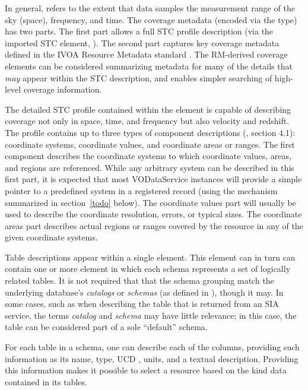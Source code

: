 \documentclass[11pt,a4paper]{ivoa}
\begin{document}
In general,  refers to
the extent that data samples the measurement range of the sky (space),
frequency, and time.  The coverage metadata (encoded via the
 type) has two parts.  The first part
allows a full STC profile description (via the imported STC element,
).  The second part
captures key coverage metadata defined in the IVOA Resource Metadata
standard \citep{RM}.  The RM-derived coverage elements can
be considered summarizing metadata for many of the details that
\emph{may} appear within the STC description, and enables simpler
searching of high-level coverage information.



The detailed STC profile contained within the
 element is capable of
describing coverage not only in space, time, and frequency but also
velocity and redshift.  The profile contains up to three types of
component descriptions (\citep{STC}, section 4.1):
coordinate systems, coordinate values, and coordinate areas or ranges.
The first component describes the coordinate systems to which coordinate
values, areas, and regions are referenced.  While any arbitrary
system can be described in this first part, it is expected that most
VODataService instances will provide a simple pointer to a predefined
system in a registered  record (using the
mechanism summarized in section~\ref{todo} below).  The coordinate values
part will usually be used to describe the coordinate resolution,
errors, or typical sizes.  The coordinate areas part describes actual
regions or ranges covered by the resource in any of the given
coordinate systems.  


Table descriptions appear within a single 
element.  This element can in turn can contain one or more
 element in which each schema
represents a set of logically related tables.  It is not required that 
that the schema grouping match the underlying database's
\emph{catalogs} or \emph{schemas} (as defined in
\citep{SQLGuide}), though it may.  In some cases,
such as when describing the table that is returned from an SIA
service, the terms \emph{catalog} and \emph{schema} may have
little relevance; in this case, the table can be considered part of a
sole ``default'' schema.  



For each table in a schema, one can describe each of the columns,
providing such information as its name, type, UCD \citep{UCD},
units, and a textual description.  Providing this information makes it
possible to select a resource based on the kind data contained in its
tables.  
\end{document}
